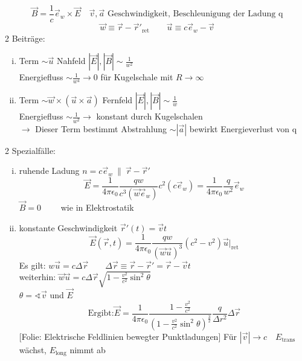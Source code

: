 \documentclass[titlepage,12pt,a4paper,ngerman]{report}
\newcommand{\tx}[1]{\textrm{#1}}
\newcommand{\folie}[1]{\color{gray}[Folie: #1]\color{black}}
\begin{document}
$$\vec{B} = \frac{1}{c} \vec{e}_w \times \vec{E} \quad \vec{v} , \vec{a} \tx{ Geschwindigkeit, Beschleunigung der Ladung q}$$
$$\vec{w} \equiv \vec{r} - \vec{r}'_{\tx{ret}} \qquad \vec{u} \equiv c \vec{e}_w - \vec{v}$$
2 Beiträge:
\begin{enumerate}[i)]
	\item Term $ \sim \vec{u} $ Nahfeld $ |\vec{E}|, |\vec{B}| \sim \frac{1}{w^2}$\\
	Energiefluss $ \sim \frac{1}{w^4} \longrightarrow 0 $ für Kugelschale mit $ R \rightarrow \infty $
	\item Term $ \sim \vec{w} \times (\vec{u} \times \vec{a}) $ Fernfeld $ |\vec{E}|,|\vec{B}| \sim \frac{1}{w} $\\
	Energiefluss $ \sim \frac{1}{w^2} \longrightarrow $ konstant durch Kugelschalen\\
	$ \rightarrow $ Dieser Term bestimmt Abstrahlung $ \sim |\vec{a}| $ bewirkt Energieverlust von q
\end{enumerate}
2 Spezialfälle:
\begin{enumerate}[i)]
	\item ruhende Ladung $ n = c \vec{e}_w \ \parallel \ \vec{r} - \vec{r}' $
	$$ \vec{E} = \frac{1}{4 \pi \epsilon_0} \frac{q w}{c^3 (\vec{w} \vec{e}_w)} c^2 (c \vec{e}_w) = \frac{1}{4 \pi \epsilon_0} \frac{q}{w^2} \vec{e}_w$$
	$\vec{B} = 0 \qquad $ wie in Elektrostatik
	\item konstante Geschwindigkeit $ \vec{r}' (t) = \vec{v}t $
	$$\vec{E}(\vec{r},t) =  \frac{1}{4 \pi \epsilon_0} \frac{qw}{(\vec{w} \vec{u})^3} (c^2 - v^2) \vec{u} \bigg|_{\tx{ret}}$$
	Es gilt: $ w \vec{u} = c \Delta \vec{r} \qquad \Delta \vec{r} \equiv \vec{r} - \vec{r}' = \vec{r} - \vec{v}t $\\
	weiterhin: $ \vec{w} \vec{u} = c \Delta \vec{r} \sqrt{1 - \frac{v^2}{c^2} \sin^2\theta} $ \\
	$ \theta = \sphericalangle \vec{v} $ und $ \vec{E} $
	$$\tx{Ergibt:} \vec{E} = \frac{1}{4 \pi \epsilon_0} \frac{1 - \frac{v^2}{c^2}}{(1-\frac{v^2}{c^2} \sin^2 \theta) ^{\frac{3}{2}}} \frac{q}{\Delta r^2} \Delta \vec{r}$$
	\folie{Elektrische Feldlinien bewegter Punktladungen}
	Für $ |\vec{v}| \rightarrow c \quad E_{\tx{trans}} $ wächst, $ E_{\tx{long}} $ nimmt ab
\end{enumerate}
\end{document}
